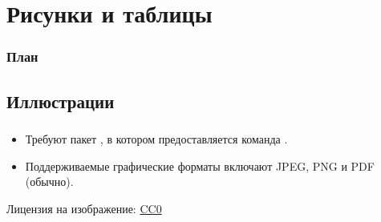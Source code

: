 \documentclass{beamer}
\begin{document}
\section{Рисунки и таблицы}

\begin{frame}
\frametitle{План}
\vspace{-3ex}
\begin{multicols}{2}
\tableofcontents[currentsection]
\end{multicols}
\end{frame}

\subsection{Иллюстрации}

\begin{frame}[fragile]
\frametitle{\insertsubsection}
\begin{itemize}
\item Требуют пакет , в котором предоставляется команда
.
\item Поддерживаемые графические форматы включают JPEG, PNG и PDF (обычно).
\end{itemize}

\tiny{Лицензия на изображение: \href{https://pixabay.com/en/animal-apple-attractive-beautiful-1239390/}{CC0}}
\end{frame}
\end{document}
